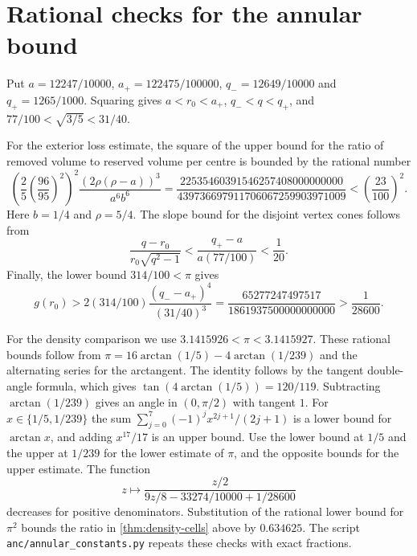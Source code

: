 \section{Rational checks for the annular bound}
\label{app:annular-constants}

Put \(a=12247/10000\), \(a_+=122475/100000\),
\(q_-=12649/10000\) and \(q_+=1265/1000\). Squaring gives
\(a<r_0<a_+\), \(q_-<q<q_+\), and
\(77/100<\sqrt{3/5}<31/40\).

For the exterior loss estimate, the square of the upper bound for
the ratio of removed volume to reserved volume per centre is
bounded by the rational number
\[
 \left(\frac25\left(\frac{96}{95}\right)^2\right)^2
 \frac{(2\rho(\rho-a))^3}{a^6 b^6}
 =\frac{22535460391546257408000000000}
        {439736697911706067259903971009}
 <\left(\frac{23}{100}\right)^2 .
\]
Here \(b=1/4\) and \(\rho=5/4\).
The slope bound for the disjoint vertex cones follows from
\[
 \frac{q-r_0}{r_0\sqrt{q^2-1}}
 < \frac{q_+-a}{a(77/100)} < \frac1{20}.
\]
Finally, the lower bound \(314/100<\pi\) gives
\[
 g(r_0)>2(314/100)\frac{(q_--a_+)^4}{(31/40)^3}
 =\frac{65277247497517}{1861937500000000000}>\frac1{28600}.
\]

For the density comparison we use
\(3.1415926<\pi<3.1415927\).
These rational bounds follow from
\(\pi=16\arctan(1/5)-4\arctan(1/239)\) and the alternating series
for the arctangent. The identity follows by the tangent double-angle
formula, which gives \(\tan(4\arctan(1/5))=120/119\).
Subtracting \(\arctan(1/239)\) gives an angle in \((0,\pi/2)\)
with tangent \(1\).
For \(x\in\{1/5,1/239\}\) the sum
\(\sum_{j=0}^7(-1)^jx^{2j+1}/(2j+1)\) is a lower bound for
\(\arctan x\), and adding \(x^{17}/17\) is an upper bound.
Use the lower bound at \(1/5\) and the upper at \(1/239\)
for the lower estimate of \(\pi\), and the opposite bounds
for the upper estimate.
The function
\[
 z\longmapsto \frac{z/2}{9z/8-33274/10000+1/28600}
\]
decreases for positive denominators. Substitution of the rational
lower bound for \(\pi^2\) bounds the ratio in
\cref{thm:density-cells} above by \(0.634625\).
The script \texttt{anc/annular\_constants.py} repeats these checks
with exact fractions.
